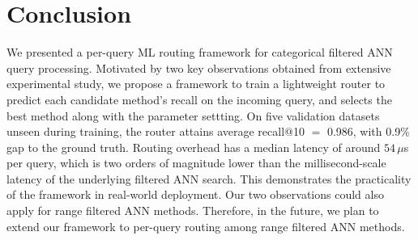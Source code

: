 \section{Conclusion}
\label{sec:conclu}
We presented a per-query ML routing framework for categorical filtered ANN query processing. Motivated by two key observations obtained from extensive experimental study, we propose a framework to train a lightweight router to predict each candidate method's recall on the incoming query, and selects the best method along with the parameter settting.
On five validation datasets unseen during training, the router attains average recall@10 $=$ 0.986, with 0.9\% gap to the ground truth. %
Routing overhead has a median latency of around $54\,\mu$s per query, which is two orders of magnitude lower than the millisecond-scale latency of the underlying filtered ANN search. This demonstrates the practicality of the framework in real-world deployment.
Our two observations could also apply for range filtered ANN methods. Therefore, in the future, we plan to extend our framework to per-query routing among range filtered ANN methods.%



